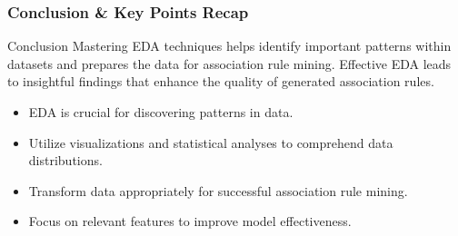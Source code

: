 \documentclass{beamer}
\begin{document}
\begin{frame}
    \frametitle{Conclusion & Key Points Recap}
    \begin{block}{Conclusion}
        Mastering EDA techniques helps identify important patterns within datasets and prepares the data for association rule mining. Effective EDA leads to insightful findings that enhance the quality of generated association rules.
    \end{block}
    
    \begin{itemize}
        \item EDA is crucial for discovering patterns in data.
        \item Utilize visualizations and statistical analyses to comprehend data distributions.
        \item Transform data appropriately for successful association rule mining.
        \item Focus on relevant features to improve model effectiveness.
    \end{itemize}
\end{frame}
\end{document}
